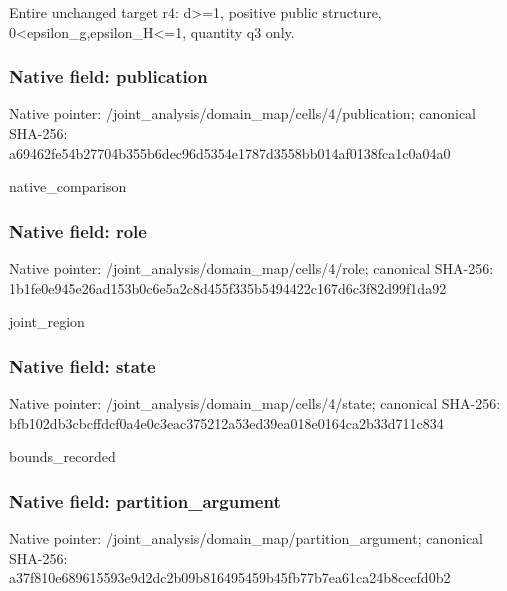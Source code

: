 \documentclass[10pt,a4paper]{article}
\begin{document}
\begingroup\raggedright\sloppy Entire unchanged target r4:\allowbreak{} d>=\allowbreak{}1,\allowbreak{} positive public structure,\allowbreak{} 0<epsilon\_\allowbreak{}g,\allowbreak{}epsilon\_\allowbreak{}H<=\allowbreak{}1,\allowbreak{} quantity q3 only.\par\endgroup

\subsubsection{Native field: publication}
Native pointer: /joint\_\allowbreak{}analysis/domain\_\allowbreak{}map/cells/4/publication; canonical SHA-256: a69462fe54b27704b355b6dec96d5354e1787d3558bb014af0138fca1c0a04a0

\begingroup\raggedright\sloppy native\_\allowbreak{}comparison\par\endgroup

\subsubsection{Native field: role}
Native pointer: /joint\_\allowbreak{}analysis/domain\_\allowbreak{}map/cells/4/role; canonical SHA-256: 1b1fe0e945e26ad153b0c6e5a2c8d455f335b5494422c167d6c3f82d99f1da92

\begingroup\raggedright\sloppy joint\_\allowbreak{}region\par\endgroup

\subsubsection{Native field: state}
Native pointer: /joint\_\allowbreak{}analysis/domain\_\allowbreak{}map/cells/4/state; canonical SHA-256: bfb102db3cbcffdcf0a4e0c3eac375212a53ed39ea018e0164ca2b33d711c834

\begingroup\raggedright\sloppy bounds\_\allowbreak{}recorded\par\endgroup

\subsubsection{Native field: partition\_\allowbreak{}argument}
Native pointer: /joint\_\allowbreak{}analysis/domain\_\allowbreak{}map/partition\_\allowbreak{}argument; canonical SHA-256: a37f810e689615593e9d2dc2b09b816495459b45fb77b7ea61ca24b8cecfd0b2
\end{document}
